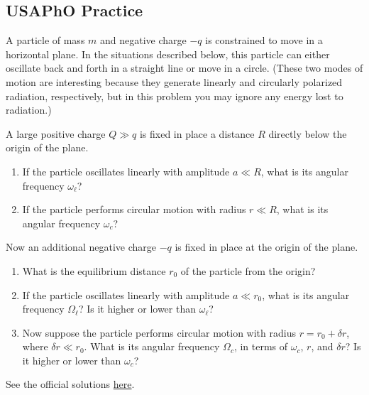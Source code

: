 \documentclass[11pt]{scrartcl}
\newcommand{\officialsol}[1]{See the official solutions \href{#1}{here}.}
\begin{document}
\subsection{USAPhO Practice}%

\begin{prob}[USAPhO 2023 A2]
A particle of mass $m$ and negative charge $-q$ is constrained to move in a horizontal plane. In the situations described below, this particle can either oscillate back and forth in a straight line or move in a circle. (These two modes of motion are interesting because they generate linearly and circularly polarized radiation, respectively, but in this problem you may ignore any energy lost to radiation.)
    \begin{anum}
        \item A large positive charge $Q\gg q$ is fixed in place a distance $R$ directly below the origin of the plane.
        \begin{enumerate}[label=(\roman*)]
            \item If the particle oscillates linearly with amplitude $a\ll R$, what is its angular frequency $\omega_\ell$?
            \item If the particle performs circular motion with radius $r \ll R$, what is its angular frequency $\omega_c$?
        \end{enumerate}
        \item Now an additional negative charge $-q$ is fixed in place at the origin of the plane.
        \begin{enumerate}[label=(\roman*)]
            \item What is the equilibrium distance $r_0$ of the particle from the origin?
            \item If the particle oscillates linearly with amplitude $a \ll r_0$, what is its angular frequency $\Omega_\ell$? Is it higher or lower than $\omega_\ell$?
            \item Now suppose the particle performs circular motion with radius $r = r_0 +\delta r$, where $\delta r \ll r_0$. What is its angular frequency $\Omega_c$, in terms of $\omega_c$, $r$, and $\delta r$? Is it higher or lower than $\omega_c$?
        \end{enumerate}
    \end{anum}
\end{prob}
\begin{sol}
    \officialsol{https://www.aapt.org/physicsteam/2023/upload/2023-USAPhO-solutions.pdf\#page=7}
\end{sol}
\end{document}

